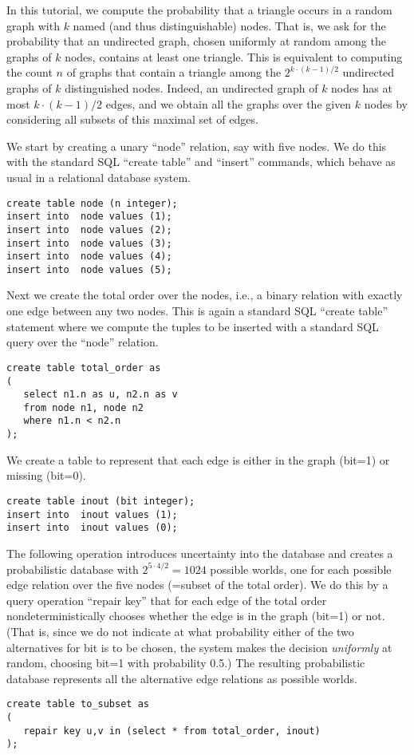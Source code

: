 In this tutorial, we compute the probability that a triangle occurs
in a random graph
with $k$ named (and thus distinguishable) nodes.
That is, we ask for the probability that an undirected
graph, chosen uniformly at random among the graphs of $k$ nodes,
contains at least one triangle.
This is equivalent to computing the count $n$ of graphs
that contain a triangle among the $2^{k \cdot (k-1)/2}$ undirected graphs of
$k$ distinguished nodes.
Indeed, an undirected graph of $k$ nodes has at most
$k \cdot (k-1)/2$ edges, and we obtain all the graphs over the given
$k$ nodes by considering all subsets of this maximal set of edges.


We start by creating a unary ``node'' relation, say with five nodes.
We do this with the standard SQL ``create table'' and ``insert'' commands,
which behave as usual in a relational database system.

\begin{verbatim}
create table node (n integer);
insert into  node values (1);
insert into  node values (2);
insert into  node values (3);
insert into  node values (4);
insert into  node values (5);
\end{verbatim}

Next we create the total order over the nodes, i.e., a binary relation
with exactly one edge between any two nodes. This is again a standard
SQL ``create table'' statement where we compute the tuples to be inserted
with a standard SQL query over the ``node'' relation.
%
\begin{verbatim}
create table total_order as
(
   select n1.n as u, n2.n as v
   from node n1, node n2
   where n1.n < n2.n
);
\end{verbatim}

We create a table to represent that each edge is either in the
graph (bit=1) or missing (bit=0).
%
\begin{verbatim}
create table inout (bit integer);
insert into  inout values (1);
insert into  inout values (0);
\end{verbatim}

The following operation introduces uncertainty into the database and
creates a probabilistic database with $2^{5 \cdot 4/2} = 1024$ possible
worlds, one for each possible edge relation over the five nodes
(=subset of the total order).
We do this by a query operation ``repair key'' that for each edge
of the total order nondeterministically chooses whether the edge is in
the graph (bit=1) or not. (That is, since we do not indicate at what
probability either of the two alternatives for bit is to be chosen, the
system makes the decision {\em uniformly}\/ at random, choosing bit=1 with
probability 0.5.) The resulting probabilistic database
represents all the alternative edge relations as possible worlds.
%
\begin{verbatim}
create table to_subset as
(
   repair key u,v in (select * from total_order, inout)
);
\end{verbatim}

